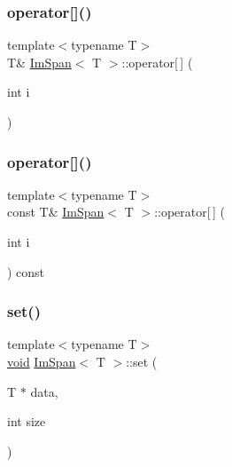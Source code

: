 \mbox{\label{structImSpan_aaed286a9cac1e66da7339a1f1f3365ee}} 
\subsubsection{\texorpdfstring{operator[]()}{operator[]()}\hspace{0.1cm}{\footnotesize\ttfamily [1/2]}}
{\footnotesize\ttfamily template$<$typename T$>$ \\
T\& \hyperlink{structImSpan}{Im\+Span}$<$ T $>$\+::operator\mbox{[}$\,$\mbox{]} (\begin{DoxyParamCaption}\item[{int}]{i }\end{DoxyParamCaption})\hspace{0.3cm}{\ttfamily [inline]}}

\mbox{\label{structImSpan_a84f94165e0b21ed2b9310bead0668a07}} 
\subsubsection{\texorpdfstring{operator[]()}{operator[]()}\hspace{0.1cm}{\footnotesize\ttfamily [2/2]}}
{\footnotesize\ttfamily template$<$typename T$>$ \\
const T\& \hyperlink{structImSpan}{Im\+Span}$<$ T $>$\+::operator\mbox{[}$\,$\mbox{]} (\begin{DoxyParamCaption}\item[{int}]{i }\end{DoxyParamCaption}) const\hspace{0.3cm}{\ttfamily [inline]}}

\mbox{\label{structImSpan_a0c07dbc18bebd7d02ca1fb866861506a}} 
\subsubsection{\texorpdfstring{set()}{set()}\hspace{0.1cm}{\footnotesize\ttfamily [1/2]}}
{\footnotesize\ttfamily template$<$typename T$>$ \\
\hyperlink{imgui__impl__opengl3__loader_8h_ac668e7cffd9e2e9cfee428b9b2f34fa7}{void} \hyperlink{structImSpan}{Im\+Span}$<$ T $>$\+::set (\begin{DoxyParamCaption}\item[{T $\ast$}]{data,  }\item[{int}]{size }\end{DoxyParamCaption})\hspace{0.3cm}{\ttfamily [inline]}}

